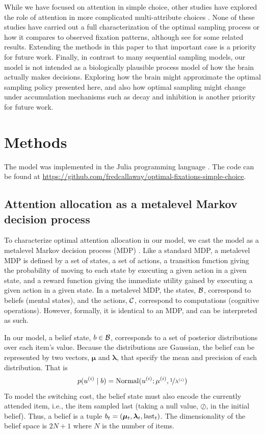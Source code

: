 While we have focused on attention in simple choice, other studies have explored the role of attention in more complicated multi-attribute choices \citep{roe2001multialternative,noguchi2018multialternative,russo1983strategies,trueblood2014multiattribute,usher2004loss,berkowitsch2014rigorously,fisher2017attentional,krajbich2012attentional,westbrook2020dopamine,shi2013information,manohar2013attention}. None of these studies have carried out a full characterization of the optimal sampling process or how it compares to observed fixation patterns, although see \citep{gabaix2006costly,yang2015bounded} for some related results. Extending the methods in this paper to that important case is a priority for future work. Finally, in contrast to many sequential sampling models, our model is not intended as a biologically plausible process model of how the brain actually makes decisions. Exploring how the brain might approximate the optimal sampling policy presented here, and also how optimal sampling might change under accumulation mechanisms such as decay and inhibition is another priority for future work.
 
\section{Methods}

The model was implemented in the Julia programming language \citep{bezanson2017julia}. The code can be found at \url{https://github.com/fredcallaway/optimal-fixations-simple-choice}.

\subsection{Attention allocation as a metalevel Markov decision process}

To characterize optimal attention allocation in our model, we cast the model as a metalevel Markov decision process (MDP) \citep{hay2012selecting}. Like a standard MDP, a metalevel MDP is defined by a set of states, a set of actions, a transition function giving the probability of moving to each state by executing a given action in a given state, and a reward function giving the immediate utility gained by executing a given action in a given state. In a metalevel MDP, the states, $\mathcal{B}$, correspond to beliefs (mental states), and the actions, $\mathcal{C}$, correspond to computations (cognitive operations). However, formally, it is identical to an MDP, and can be interpreted as such.

In our model, a belief state, $b \in \mathcal{B}$, corresponds to a set of posterior distributions over each item's value. Because the distributions are Gaussian, the belief can be represented by two vectors, $\boldsymbol{\mu}$ and $\boldsymbol{\lambda}$, that specify the mean and precision of each distribution. That is 
$$
p(u^{(i)} \mid b) = \mathrm{Normal}(u^{(i)}; \mu^{(i)}, \nicefrac{1}{\lambda^{(i)}})
$$
To model the switching cost, the belief state must also encode the currently attended item, i.e., the item sampled last (taking a null value, $\oslash$, in the initial belief). Thus, a belief is a tuple $b_t = (\boldsymbol{\mu}_t, \boldsymbol{\lambda}_t, \mathrm{last}_t)$. The dimensionality of the belief space is $2N + 1$ where $N$ is the number of items.

